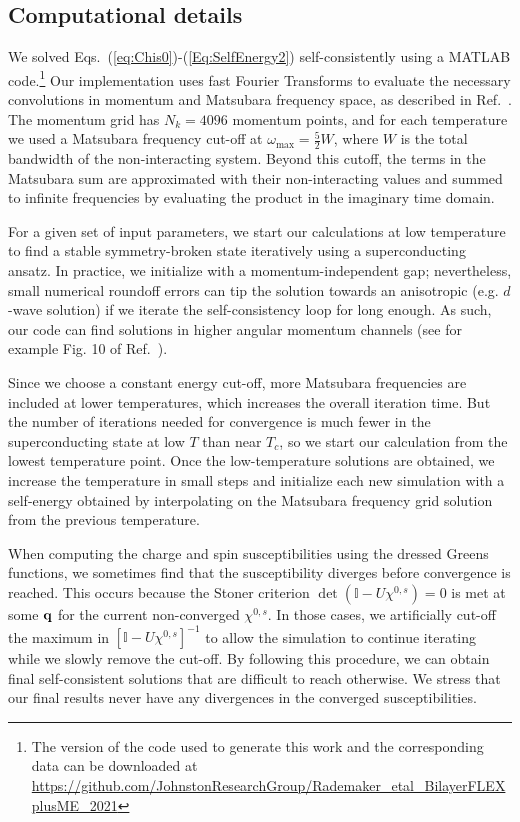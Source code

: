 \documentclass[%
 reprint,
 superscriptaddress,
nofootinbib,
nobibnotes,
 amsmath,amssymb,
 aps,
 prb,
 dvipsnames, 
 floatfix
]{revtex4-2}
\begin{document}
\subsection{Computational details}\label{Appendix:ComputationalDetails}
We solved Eqs.~(\ref{eq:Chis0})-(\ref{Eq:SelfEnergy2}) self-consistently using a \mbox{MATLAB} code.\footnote{The version of the code used to generate this work and the 
corresponding data can be downloaded at  \url{https://github.com/JohnstonResearchGroup/Rademaker_etal_BilayerFLEXplusME_2021}} 
Our implementation uses fast Fourier Transforms to evaluate the necessary convolutions in momentum and Matsubara frequency space, as described in Ref.~\cite{DeePRB2019}. The momentum grid has $N_k = 4096$ momentum points, and for each temperature we used a Matsubara frequency cut-off at $\omega_{\mathrm{max}} = \tfrac{5}{2}W$, where $W$ is the total bandwidth of the non-interacting system. Beyond this cutoff, the terms in the Matsubara sum are approximated with their non-interacting values and summed to infinite frequencies by evaluating the product in the imaginary time domain.

For a given set of input parameters, we start our calculations at low temperature to find a stable symmetry-broken state iteratively using a superconducting ansatz. In practice, we initialize with a momentum-independent gap; nevertheless, small numerical roundoff errors can tip the solution towards an anisotropic (e.g. $d$-wave solution) if we iterate the self-consistency loop for long enough. As such, our code can find solutions in higher angular momentum channels (see for example Fig. 10 of Ref.~\cite{WangSUST}). 

Since we choose a constant energy cut-off, more Matsubara frequencies are included at lower temperatures, which increases the overall iteration time. But the number of iterations needed for convergence is much fewer in the superconducting state at low $T$ than near $T_c$, so we start our calculation from the lowest temperature point. Once the low-temperature solutions are obtained, we increase the temperature in small steps and initialize each new simulation with a self-energy obtained by interpolating on the Matsubara frequency grid solution from the previous temperature. 

When computing the charge and spin susceptibilities using the dressed Greens functions, we sometimes find that the susceptibility diverges before convergence is reached. This occurs because the Stoner criterion $\det \left(\mathbb{I}-U\chi^{0,s} \right)=0$ is met at some ${\bf q}$ for the current non-converged $\chi^{0,s}$. In those cases, we artificially cut-off the maximum in $[\mathbb{I}-U\chi^{0,s}]^{-1}$ to allow the simulation to continue iterating while we slowly remove the cut-off. By following this procedure, we can obtain final self-consistent solutions that are difficult to reach otherwise. We stress that our final results never have any divergences in the converged susceptibilities. 
\end{document}
